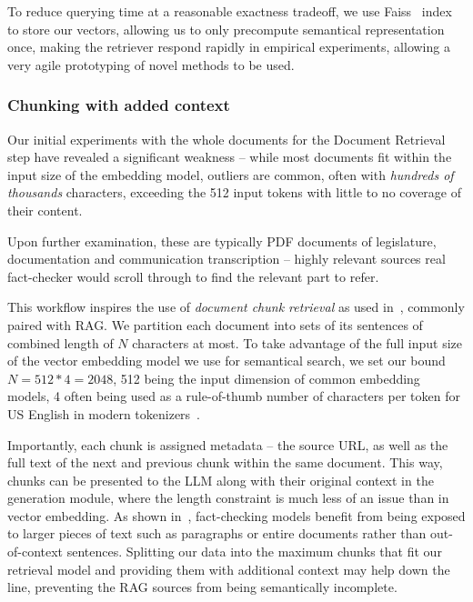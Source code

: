 To reduce querying time at a reasonable exactness tradeoff, we use Faiss~\cite{douze2024faiss,johnson2019billion} index to store our vectors, allowing us to only precompute semantical representation once, making the retriever respond rapidly in empirical experiments, allowing a very agile prototyping of novel methods to be used.

\subsubsection{Chunking with added context}
Our initial experiments with the whole \averitec{}  documents for the Document Retrieval step have revealed a significant weakness -- while most documents fit within the input size of the embedding model, outliers are common, often with \textit{hundreds of thousands} characters, exceeding the 512 input tokens with little to no coverage of their content.

Upon further examination, these are typically PDF documents of legislature, documentation and communication transcription -- highly relevant sources real fact-checker would scroll through to find the relevant part to refer. 

This workflow inspires the use of \textit{document chunk retrieval} as used in~\cite{rag}, commonly paired with RAG.
We partition each document into sets of its sentences of combined length of $N$ characters at most.
To take advantage of the full input size of the vector embedding model we use for semantical search, we set our bound $N=512*4=2048$, 512 being the input dimension of common embedding models, 4 often being used as a rule-of-thumb number of characters per token for US English in modern tokenizers~\cite{tokens}.

Importantly, each chunk is  assigned metadata -- the source URL, as well as the full text of the next and previous chunk within the same document.
This way, chunks can be presented to the LLM along with their original context in the generation module, where the length constraint is much less of an issue than in vector embedding.
As shown in~\cite{drchal2023pipelinedatasetgenerationautomated}, fact-checking models benefit from being exposed to larger pieces of text such as paragraphs or entire documents rather than out-of-context sentences.
Splitting our data into the maximum chunks that fit our retrieval model and providing them with additional context may help down the line, preventing the RAG sources from being semantically incomplete.

